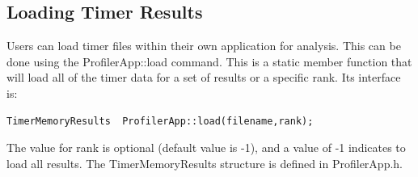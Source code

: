 \documentclass[fleqn,10pt,letterpaper]{article}
\begin{document}
\subsection{Loading Timer Results}

Users can load timer files within their own application for analysis.  This can
be done using the ProfilerApp::load command.  This is a static member function
that will load all of the timer data for a set of results or a specific rank.  
Its interface is:
\begin{Verbatim}[fontsize=\normal,baselinestretch=1.0]
    TimerMemoryResults  ProfilerApp::load(filename,rank);
\end{Verbatim}
The value for rank is optional (default value is -1), and a value of -1 indicates to
load all results.  
The TimerMemoryResults structure is defined in ProfilerApp.h.  




\end{document}

